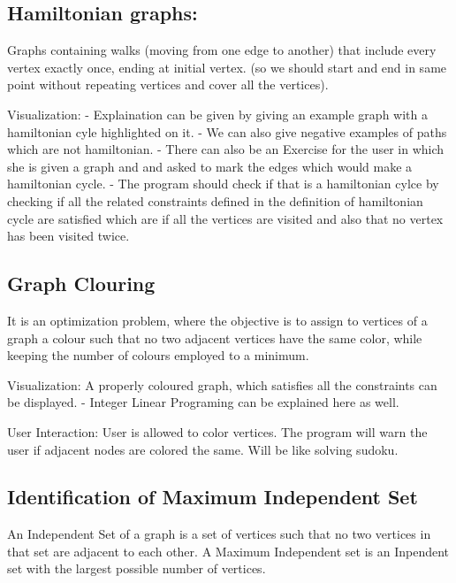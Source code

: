 \hypertarget{hamiltonian-graphs}{%
\subsection{Hamiltonian graphs:}\label{hamiltonian-graphs}}

Graphs containing walks (moving from one edge to another) that include
every vertex exactly once, ending at initial vertex. (so we should start
and end in same point without repeating vertices and cover all the
vertices).

Visualization: - Explaination can be given by giving an example graph
with a hamiltonian cyle highlighted on it. - We can also give negative
examples of paths which are not hamiltonian. - There can also be an
Exercise for the user in which she is given a graph and and asked to
mark the edges which would make a hamiltonian cycle. - The program
should check if that is a hamiltonian cylce by checking if all the
related constraints defined in the definition of hamiltonian cycle are
satisfied which are if all the vertices are visited and also that no
vertex has been visited twice.

\hypertarget{graph-clouring}{%
\subsection{Graph Clouring}\label{graph-clouring}}

It is an optimization problem, where the objective is to assign to
vertices of a graph a colour such that no two adjacent vertices have the
same color, while keeping the number of colours employed to a minimum.


Visualization: A properly coloured graph, which satisfies all the
constraints can be displayed. - Integer Linear Programing can be
explained here as well.


User Interaction: User is allowed to color vertices. The program
will warn the user if adjacent nodes are colored the same. Will be
like solving sudoku.

\hypertarget{identification-of-maximum-independent-set}{%
\subsection{Identification of Maximum Independent
Set}\label{identification-of-maximum-independent-set}}

An Independent Set of a graph is a set of vertices such that no two
vertices in that set are adjacent to each other. A Maximum Independent
set is an Inpendent set with the largest possible number of vertices.


